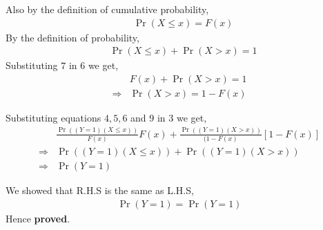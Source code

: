 \documentclass{beamer}
\providecommand{\pr}[1]{\ensuremath{\Pr\left(#1\right)}}
\begin{document}
    \begin{frame}
    Also by the definition of cumulative probability,
\begin{align}
    &\pr{X \leq x}=F(x) 
    \end{align}
By the definition of probability,    
    \begin{align}
    &\pr{X \leq x}+\pr{X>x}=1 
    \end{align}
   Substituting $7$ in $6$ we get,
\begin{align}
    &F(x)+\pr{X>x}=1 \\
    \Rightarrow &\pr{X>x}=1-F(x) 
\end{align}
\end{frame}
\begin{frame}
    Substituting equations $4,5,6$ and $9$ in 3 we get,
\begin{align}
&\frac{\pr{(Y=1)(X\leq x)}}{F(x)}F(x)+ \frac{\pr{(Y=1)(X>x)}}{(1-F(x)}[1-F(x)] \\
\Rightarrow &\pr{(Y=1)(X\leq x)} + \pr{(Y=1)(X>x)}\\
\Rightarrow&\pr{Y=1}
\end{align}
\end{frame}
\begin{frame}
We showed that R.H.S is the same as L.H.S,
\begin{align}
    \pr{Y=1}=\pr{Y=1}
\end{align}
    \centering
       Hence \textbf{proved}.
\end{frame}         
     
     
     
\end{document}
